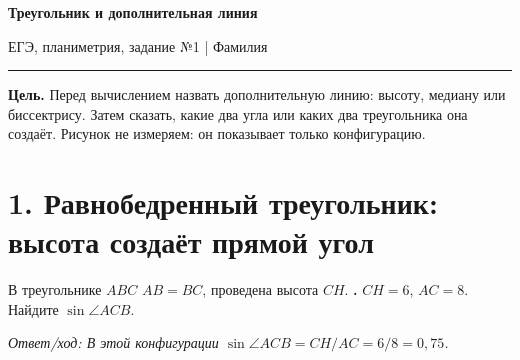 
\pagestyle{fancy}
\fancyhf{}
\cfoot{\thepage}
\setlength{\headheight}{15pt}
\setlength{\parindent}{0pt}
\newcommand{\ex}{\stepcounter{exercise}\textbf{\theexercise.} }
\newcommand{\answerline}[1]{\rule{#1}{0.4pt}}
\newcommand{\teacheranswer}[1]{\ifteacher\par\smallskip\textit{Ответ/ход: #1}\par\fi}
\newcommand{\rulecard}[2]{\noindent\fbox{\begin{minipage}{.94\linewidth}\textbf{#1} \quad #2\end{minipage}}\par\smallskip}
\newcommand{\picturedtask}[3]{%
\item \begin{minipage}[t]{.64\linewidth}#1\teacheranswer{#3}\end{minipage}\hfill
\begin{minipage}[t]{.31\linewidth}\centering\resizebox{\linewidth}{!}{#2}\end{minipage}\par\medskip}
\newcommand{\taskfigure}[3]{%
\begin{minipage}[t]{.64\linewidth}#1\teacheranswer{#3}\end{minipage}\hfill
\begin{minipage}[t]{.31\linewidth}\centering\resizebox{\linewidth}{!}{#2}\end{minipage}\par\medskip}


\begin{center}
{\Large\textbf{Треугольник и дополнительная линия}}\\[2mm]
{\small ЕГЭ, планиметрия, задание №1 \quad | \quad Фамилия\ \answerline{6cm}}
\end{center}
\ifteacher
\begin{center}\end{center}
\fi

\textbf{Цель.} Перед вычислением назвать дополнительную линию: высоту, медиану
или биссектрису. Затем сказать, какие два угла или каких два треугольника она
создаёт. Рисунок не измеряем: он показывает только конфигурацию.

\section*{1. Равнобедренный треугольник: высота создаёт прямой угол}
\taskfigure{В треугольнике \(ABC\) \(AB=BC\), проведена высота \(CH\).
\ex \(CH=6\), \(AC=8\). Найдите \(\sin\angle ACB\).}
{\figIsoscelesSine{6}{8}}{В этой конфигурации
\(\sin\angle ACB=CH/AC=6/8=0{,}75\).}

